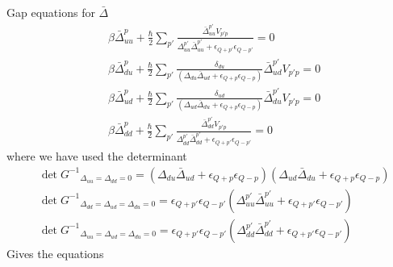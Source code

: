 \documentclass{article}
\begin{document}
Gap equations for $\bar{\Delta}$
\begin{align}
     &\beta{\bar{\Delta}}_{uu}^{p} + \frac{\hbar}{2} \sum_{p'} \frac{\bar{\Delta}_{uu}^{p'}  V_{p'p}}{\Delta_{uu}^{p'} \bar{\Delta}_{uu}^{p'} + \epsilon_{Q+p'} \epsilon_{Q-p'}}  = 0\nonumber\\
     &\beta \bar{\Delta}_{du}^p + \frac{\hbar}{2} \sum_{p'} \frac{\delta_{du}}{\left(\Delta_{du} \bar{\Delta}_{ud} + \epsilon_{Q+p} \epsilon_{Q-p}\right)} \bar{\Delta}_{ud}^{p'} V_{p'p}  = 0\nonumber\\
     &\beta \bar{\Delta}^{p}_{ud} + \frac{\hbar}{2} \sum_{p'} \frac{\delta_{ud}}{\left(\Delta_{ud} \bar{\Delta}_{du} + \epsilon_{Q+p} \epsilon_{Q-p}\right)} \bar{\Delta}_{du}^{p'} V_{p'p} = 0 \nonumber \\
     &\beta{\bar{\Delta}}_{dd}^{p} + \frac{\hbar}{2} \sum_{p'} \frac{\bar{\Delta}_{dd}^{p'}  V_{p'p}}{\Delta_{dd}^{p'} \bar{\Delta}_{dd}^{p'} + \epsilon_{Q+p'} \epsilon_{Q-p'}}  = 0\nonumber
     \label{gap equation deltabar}
\end{align}
where we have used the determinant
\begin{align}
&\det{G^{-1}}_{\Delta_{uu} = \Delta_{dd} = 0} = \left(\Delta_{du} \bar{\Delta}_{ud} + \epsilon_{Q+p} \epsilon_{Q-p}\right) \left(\Delta_{ud} \bar{\Delta}_{du} + \epsilon_{Q+p} \epsilon_{Q-p}\right) \nonumber \\
%
&\det{G^{-1}}_{\Delta_{dd} = \Delta_{ud}  = \Delta_{du} = 0} = \epsilon_{Q+p'} \epsilon_{Q-p'} \left( \Delta^{p'}_{uu} \bar{\Delta}^{p'}_{uu} + \epsilon_{Q+p'} \epsilon_{Q-p'}\right)\nonumber\\
%
&\det{G^{-1}}_{\Delta_{uu} = \Delta_{ud}  = \Delta_{du} = 0} = \epsilon_{Q+p'} \epsilon_{Q-p'} \left( \Delta^{p'}_{dd} \bar{\Delta}^{p'}_{dd} + \epsilon_{Q+p'} \epsilon_{Q-p'}\right)\nonumber
\end{align}
Gives the equations
\end{document}
